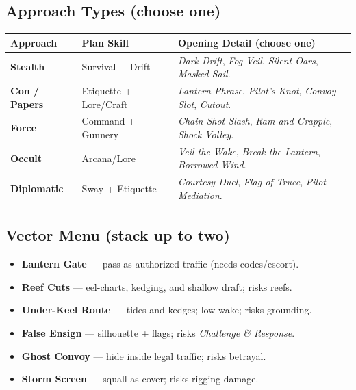 \documentclass[11pt,oneside]{book}
\begin{document}
\subsection*{Approach Types (choose one)}
\begin{tabularx}{\linewidth}{@{}p{3.1cm} p{2.3cm} X@{}}
\toprule
\textbf{Approach} & \textbf{Plan Skill} & \textbf{Opening Detail (choose one)}\\
\midrule
\textbf{Stealth} & Survival + Drift & \emph{Dark Drift}, \emph{Fog Veil}, \emph{Silent Oars}, \emph{Masked Sail}.\\
\textbf{Con / Papers} & Etiquette + Lore/Craft & \emph{Lantern Phrase}, \emph{Pilot's Knot}, \emph{Convoy Slot}, \emph{Cutout}.\\
\textbf{Force} & Command + Gunnery & \emph{Chain-Shot Slash}, \emph{Ram and Grapple}, \emph{Shock Volley}.\\
\textbf{Occult} & Arcana/Lore & \emph{Veil the Wake}, \emph{Break the Lantern}, \emph{Borrowed Wind}.\\
\textbf{Diplomatic} & Sway + Etiquette & \emph{Courtesy Duel}, \emph{Flag of Truce}, \emph{Pilot Mediation}.\\
\bottomrule
\end{tabularx}

\subsection*{Vector Menu (stack up to two)}
\begin{itemize}
  \item \textbf{Lantern Gate} --- pass as authorized traffic (needs codes/escort).
  \item \textbf{Reef Cuts} --- eel-charts, kedging, and shallow draft; risks reefs.
  \item \textbf{Under-Keel Route} --- tides and kedges; low wake; risks grounding.
  \item \textbf{False Ensign} --- silhouette + flags; risks \emph{Challenge \& Response}.
  \item \textbf{Ghost Convoy} --- hide inside legal traffic; risks betrayal.
  \item \textbf{Storm Screen} --- squall as cover; risks rigging damage.
\end{itemize}
\end{document}
